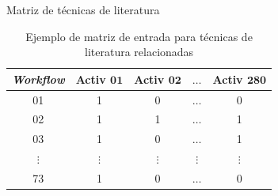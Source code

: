 \begin{frame}		
	\begin{block}{Matriz de técnicas de literatura}
		\begin{table}[htb]
			\centering
			\caption{Ejemplo de matriz de entrada para técnicas de literatura relacionadas}
			\begin{tabular}{|c|c|c|c|c|}  \hline
				\textbf{\emph{Workflow}} & \textbf{Activ \(\mathbf{01}\)} & \textbf{Activ \(\mathbf{02}\)} & \textbf{\(\mathbf{\ldots}\)} & \textbf{Activ \(\mathbf{280}\)}  \\ \hline
				01 			  & 1 			  & 0 			  & \(\ldots\) 	  & 0  				\\ \hline
				02 			  & 1 			  & 1 			  & \(\ldots\) 	  & 1  				\\ \hline
				03 			  & 1 			  & 0 			  & \(\ldots\) 	  & 1  				\\ \hline
				\(\vdots\) 		  			  & \(\vdots\) 	  & \(\vdots\) 	  & \(\vdots\) 	  & \(\vdots\) 		\\ \hline
				73 			  & 1 			  & 0 			  & \(\ldots\) 	  & 0  				\\ \hline
			\end{tabular}
			\label{tabela_matriz_de_dados}
		\end{table}
	\end{block}
\end{frame}


